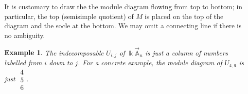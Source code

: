 \documentclass[11pt,a4paper]{article}
\numberwithin{equation}{section}
\theoremstyle{all}
\newtheorem{example}[theorem]{Example}
\newtheorem{definition}[theorem]{Definition}
\theoremstyle{remark}
\newcommand{\linA}{\vec{\mathbb{A}}}
\newcommand{\defn}[1]{\textsl{\color{darkblue} #1}}
\begin{document}
It is customary to draw the the module diagram flowing from top to bottom; in particular, the top (semisimple quotient) of $M$ is placed on the top of the diagram and the socle at the bottom.
We may omit a connecting line if there is no ambiguity.

\begin{example}
The indecomposable $U_{i,j}$ of $\Bbbk \linA_n$ is just a column of numbers labelled from $i$ down to $j$.  For a concrete example, the module diagram of $U_{4,6}$ is just $\begin{smallmatrix}
4\\5\\6\end{smallmatrix}$.
\end{example}

%
%
%
%
%
\end{document}
